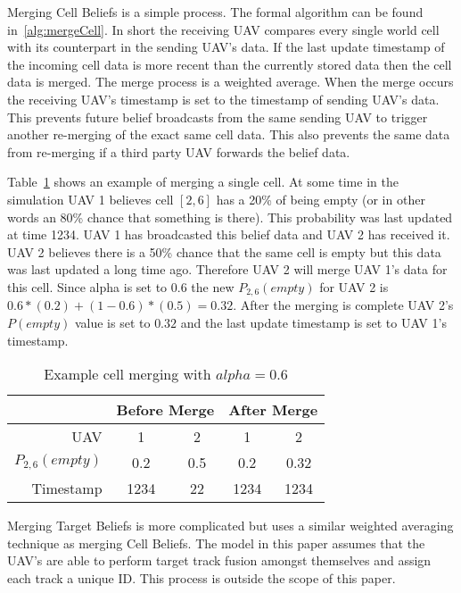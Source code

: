 Merging Cell Beliefs is a simple process.  The formal algorithm can be found in~\ref{alg:mergeCell}.  In short the receiving UAV compares every single world cell with its counterpart in the sending UAV's data.  If the last update timestamp of the incoming cell data is more recent than the currently stored data then the cell data is merged.  The merge process is a weighted average.  When the merge occurs the receiving UAV's timestamp is set to the timestamp of sending UAV's data.  This prevents future belief broadcasts from the same sending UAV to trigger another re-merging of the exact same cell data.  This also prevents the same data from re-merging if a third party UAV forwards the belief data. 

Table~\ref{tab:exampleCellMerge} shows an example of merging a single cell.  At some time in the simulation UAV 1 believes cell $[2, 6]$ has a 20\% of being empty (or in other words an 80\% chance that something is there). This probability was last updated at time 1234.  UAV 1 has broadcasted this belief data and UAV 2 has received it.  UAV 2 believes there is a 50\% chance that the same cell is empty but this data was last updated a long time ago.  Therefore UAV 2 will merge UAV 1's data for this cell.  Since alpha is set to 0.6 the new $P_{2,6}(empty)$ for UAV 2 is $0.6*(0.2) + (1-0.6)*(0.5)=0.32$.  After the merging is complete UAV 2's $P(empty)$ value is set to $0.32$ and the last update timestamp is set to UAV 1's timestamp.

\begin{table}[h]
	\caption{Example cell merging with $alpha=0.6$}
	\centering
	\label{tab:exampleCellMerge}
	\begin{tabular}{|r|c|c||c|c|}
		\hline
		                & \multicolumn{2}{c||}{Before Merge} & \multicolumn{2}{c|}{After Merge} \\
		\hline
		UAV             & 1   & 2                            & 1   & 2 \\
		\hline
		$P_{2,6}(empty)$& 0.2 & 0.5                          & 0.2 & 0.32 \\
		\hline
		Timestamp       & 1234& 22                           & 1234& 1234 \\
		\hline
	\end{tabular}
\end{table}

Merging Target Beliefs is more complicated but uses a similar weighted averaging technique as merging Cell Beliefs.  The model in this paper assumes that the UAV's are able to perform target track fusion amongst themselves and assign each track a unique ID.  This process is outside the scope of this paper.

